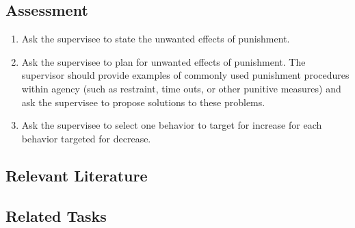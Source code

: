 \subsection{Assessment}
\begin{enumerate}
\item Ask the supervisee to state the unwanted effects of punishment.
\item Ask the supervisee to plan for unwanted effects of punishment.  The supervisor should provide examples of commonly used punishment procedures within agency (such as restraint, time outs, or other punitive measures) and ask the supervisee to propose solutions to these problems. 
\item Ask the supervisee to select one behavior to target for increase for each behavior targeted for decrease. 
\end{enumerate}
%
\subsection{Relevant Literature}
\begin{refsection}
\nocite{test,alang2017police,clayton2018black}
\printbibliography[heading=none]
\end{refsection}
%
\subsection{Related Tasks}
\fourcTwo{}\\
\fourdSixteen{}\\
\fourdSeventeen{}\\
\fourdNineteen{}\\
\foureSeven{}\\
\fourFKThirtyOne{}\\
%
%
%
%
%
%
